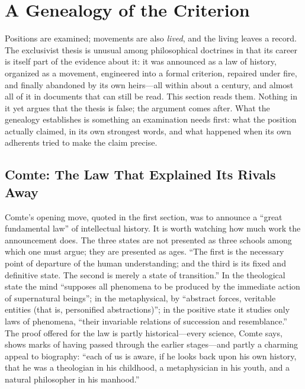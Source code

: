 \section{A Genealogy of the Criterion}

Positions are examined; movements are also \emph{lived}, and the living leaves a record. The exclusivist thesis is unusual among philosophical doctrines in that its career is itself part of the evidence about it: it was announced as a law of history, organized as a movement, engineered into a formal criterion, repaired under fire, and finally abandoned by its own heirs---all within about a century, and almost all of it in documents that can still be read. This section reads them. Nothing in it yet argues that the thesis is false; the argument comes after. What the genealogy establishes is something an examination needs first: what the position actually claimed, in its own strongest words, and what happened when its own adherents tried to make the claim precise.

\subsection{Comte: The Law That Explained Its Rivals Away}

Comte's opening move, quoted in the first section, was to announce a ``great fundamental law'' of intellectual history. It is worth watching how much work the announcement does. The three states are not presented as three schools among which one must argue; they are presented as ages. ``The first is the necessary point of departure of the human understanding; and the third is its fixed and definitive state. The second is merely a state of transition.'' In the theological state the mind ``supposes all phenomena to be produced by the immediate action of supernatural beings''; in the metaphysical, by ``abstract forces, veritable entities (that is, personified abstractions)''; in the positive state it studies only laws of phenomena, ``their invariable relations of succession and resemblance.'' The proof offered for the law is partly historical---every science, Comte says, shows marks of having passed through the earlier stages---and partly a charming appeal to biography: ``each of us is aware, if he looks back upon his own history, that he was a theologian in his childhood, a metaphysician in his youth, and a natural philosopher in his manhood.''

